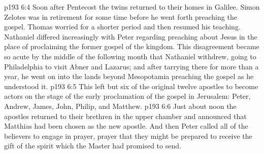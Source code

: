\pc \vs p193 6:4 Soon after Pentecost the twins returned to their homes in Galilee. Simon Zelotes was in retirement for some time before he went forth preaching the gospel. Thomas worried for a shorter period and then resumed his teaching. Nathaniel differed increasingly with Peter regarding preaching about Jesus in the place of proclaiming the former gospel of the kingdom. This disagreement became so acute by the middle of the following month that Nathaniel withdrew, going to Philadelphia to visit Abner and Lazarus; and after tarrying there for more than a year, he went on into the lands beyond Mesopotamia preaching the gospel as he understood it.
\vs p193 6:5 This left but six of the original twelve apostles to become actors on the stage of the early proclamation of the gospel in Jerusalem: Peter, Andrew, James, John, Philip, and Matthew.
\pc \vs p193 6:6 Just about noon the apostles returned to their brethren in the upper chamber and announced that Matthias had been chosen as the new apostle. And then Peter called all of the believers to engage in prayer, prayer that they might be prepared to receive the gift of the spirit which the Master had promised to send.
